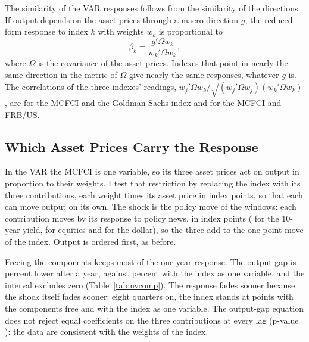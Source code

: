 \documentclass[11pt]{article}
\begin{document}
The similarity of the VAR responses follows from the similarity of the directions. If output depends on the asset prices through a macro direction $g$, the reduced-form response to index $k$ with weights $w_k$ is proportional to
\begin{equation}\label{eq:beta}
\beta_k=\frac{g'\Omega w_k}{w_k'\Omega w_k},
\end{equation}
where $\Omega$ is the covariance of the asset prices. Indexes that point in nearly the same direction in the metric of $\Omega$ give nearly the same responses, whatever $g$ is. The correlations of the three indexes' readings, $w_j'\Omega w_k/\sqrt{(w_j'\Omega w_j)(w_k'\Omega w_k)}$, are  for the MCFCI and the Goldman Sachs index and  for the MCFCI and FRB/US.

\subsection{Which Asset Prices Carry the Response}\label{sec:components}
In the VAR the MCFCI is one variable, so its three asset prices act on output in proportion to their weights. I test that restriction by replacing the index with its three contributions, each weight times its asset price in index points, so that each can move output on its own. The shock is the policy move of the windows: each contribution moves by its response to policy news, in index points ( for the 10-year yield,  for equities and  for the dollar), so the three add to the one-point move of the index. Output is ordered first, as before.

Freeing the components keeps most of the one-year response. The output gap is  percent lower after a year, against  percent with the index as one variable, and the interval excludes zero (Table~\ref{tab:nvcomp}). The response fades sooner because the shock itself fades sooner: eight quarters on, the index stands at  points with the components free and  with the index as one variable. The output-gap equation does not reject equal coefficients on the three contributions at every lag (p-value ): the data are consistent with the weights of the index.
\end{document}
